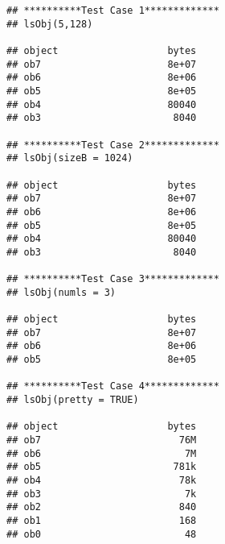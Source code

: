 \documentclass{article}\usepackage{graphicx, color}
\makeatletter
\newenvironment{kframe}{%
 \def\at@end@of@kframe{}%
 \ifinner\ifhmode%
  \def\at@end@of@kframe{\end{minipage}}%
  \begin{minipage}{\columnwidth}%
 \fi\fi%
 \def\FrameCommand##1{\hskip\@totalleftmargin \hskip-\fboxsep
 \colorbox{shadecolor}{##1}\hskip-\fboxsep
     \hskip-\linewidth \hskip-\@totalleftmargin \hskip\columnwidth}%
 \MakeFramed {\advance\hsize-\width
   \@totalleftmargin\z@ \linewidth\hsize
   \@setminipage}}%
 {\par\unskip\endMakeFramed%
 \at@end@of@kframe}
\newenvironment{knitrout}{}{} %
\makeatother
\begin{document}
\begin{knitrout}
\color{fgcolor}\begin{kframe}
\begin{verbatim}
## **********Test Case 1*************
## lsObj(5,128)

## object                   bytes
## ob7                      8e+07
## ob6                      8e+06
## ob5                      8e+05
## ob4                      80040
## ob3                       8040

## **********Test Case 2*************
## lsObj(sizeB = 1024)

## object                   bytes
## ob7                      8e+07
## ob6                      8e+06
## ob5                      8e+05
## ob4                      80040
## ob3                       8040

## **********Test Case 3*************
## lsObj(numls = 3)

## object                   bytes
## ob7                      8e+07
## ob6                      8e+06
## ob5                      8e+05

## **********Test Case 4*************
## lsObj(pretty = TRUE)

## object                   bytes
## ob7                        76M
## ob6                         7M
## ob5                       781k
## ob4                        78k
## ob3                         7k
## ob2                        840
## ob1                        168
## ob0                         48
\end{verbatim}
\end{kframe}
\end{knitrout}
\end{document}
